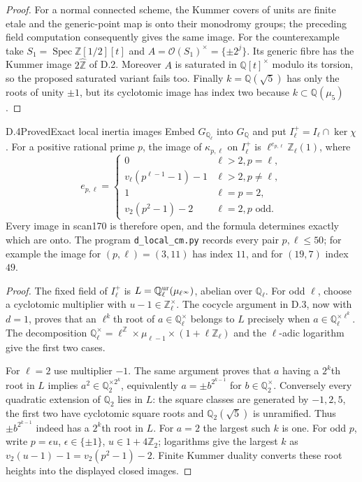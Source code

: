 \begin{proof}
For a normal connected scheme, the Kummer covers of units are finite etale and the generic-point map is onto their monodromy groups; the preceding field computation consequently gives the same image. For the counterexample take $S_1=\operatorname{Spec}\mathbb Z[1/2][t]$ and $A=\mathcal O(S_1)^\times=\{\pm2^j\}$. Its generic fibre has the Kummer image $2\widehat{\mathbb Z}$ of D.2. Moreover $A$ is saturated in $\mathbb Q[t]^\times$ modulo its torsion, so the proposed saturated variant fails too. Finally $k=\mathbb Q(\sqrt5)$ has only the roots of unity $\pm1$, but its cyclotomic image has index two because $k\subset\mathbb Q(\mu_5)$.
\end{proof}

\begin{statement}{D.4}{Proved}{Exact local inertia images}
Embed $G_{\mathbb Q_\ell}$ into $G_{\mathbb Q}$ and put $I_\ell^+=I_\ell\cap\ker\chi$. For a positive rational prime $p$, the image of $\kappa_{p,\ell}$ on $I_\ell^+$ is $\ell^{e_{p,\ell}}\mathbb Z_\ell(1)$, where
\[
 e_{p,\ell}=\begin{cases}
 0&\ell>2, p=\ell,\\
 v_\ell(p^{\ell-1}-1)-1&\ell>2, p\ne\ell,\\
 1&\ell=p=2,\\
 v_2(p^2-1)-2&\ell=2, p\text{ odd}.
 \end{cases}                                               \tag{D.4}
\]
Every image in scan170 is therefore open, and the formula determines exactly which are onto. The program \texttt{d\_local\_cm.py} records every pair $p,\ell\leq50$; for example the image for $(p,\ell)=(3,11)$ has index $11$, and for $(19,7)$ index $49$.
\end{statement}
\begin{proof}
The fixed field of $I_\ell^+$ is $L=\mathbb Q_\ell^{\rm ur}(\mu_{\ell^\infty})$, abelian over $\mathbb Q_\ell$. For odd $\ell$, choose a cyclotomic multiplier with $u-1\in\mathbb Z_\ell^\times$. The cocycle argument in D.3, now with $d=1$, proves that an $\ell^k$th root of $a\in\mathbb Q_\ell^\times$ belongs to $L$ precisely when $a\in\mathbb Q_\ell^{\times\ell^k}$. The decomposition
$\mathbb Q_\ell^\times=\ell^{\mathbb Z}\times\mu_{\ell-1}\times(1+\ell\mathbb Z_\ell)$ and the $\ell$-adic logarithm give the first two cases.

For $\ell=2$ use multiplier $-1$. The same argument proves that $a$ having a $2^k$th root in $L$ implies $a^2\in\mathbb Q_2^{\times2^k}$, equivalently $a=\pm b^{2^{k-1}}$ for $b\in\mathbb Q_2^\times$. Conversely every quadratic extension of $\mathbb Q_2$ lies in $L$: the square classes are generated by $-1,2,5$, the first two have cyclotomic square roots and $\mathbb Q_2(\sqrt5)$ is unramified. Thus $\pm b^{2^{k-1}}$ indeed has a $2^k$th root in $L$. For $a=2$ the largest such $k$ is one. For odd $p$, write $p=\epsilon u$, $\epsilon\in\{\pm1\}$, $u\in1+4\mathbb Z_2$; logarithms give the largest $k$ as $v_2(u-1)-1=v_2(p^2-1)-2$. Finite Kummer duality converts these root heights into the displayed closed images.
\end{proof}

